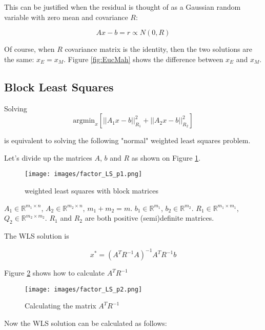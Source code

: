 \documentclass{article}
\begin{document}
This can be justified when the residual is thought of as a Gaussian random variable with zero mean and covariance $R$:

\begin{equation}
    Ax - b = r \propto N(0, R)
\end{equation}

Of course, when $R$ covariance matrix is the identity, then the two solutions are the same: $x_E = x_M$. Figure \ref{fig:EucMah} shows the difference between $x_E$ and $x_M$.

\subsection{Block Least Squares}

Solving
\begin{equation}
    \text{argmin}_x \left[||A_1 x - b||^2_{R_1} + ||A_2 x - b||^2_{R_2}\right]
\end{equation}

is equivalent to solving the following "normal" weighted least squares problem.

Let's divide up the matrices $A$, $b$ and $R$ as shown on Figure \ref{fig:BlockLS}.

\begin{figure}[ht]
 \centering
  \texttt{[image: images/factor\_LS\_p1.png]}
  \caption{weighted least squares with block matrices}
  \label{fig:BlockLS}
\end{figure}


$A_1 \in \mathbb{R}^{m_1 \times n}$, $A_2 \in \mathbb{R}^{m_2 \times n}$, $m_1 + m_2 = m$. $b_1 \in \mathbb{R}^{m_1}$, $b_2 \in \mathbb{R}^{m_2}$. $R_1 \in \mathbb{R}^{m_1 \times m_1}$, $Q_2 \in \mathbb{R}^{m_2 \times m_2}$. $R_1$ and $R_2$ are both positive (semi)definite matrices.

The WLS solution is

\begin{equation}
    x^* = (A^T R^{-1} A)^{-1} A^T R^{-1} b
\end{equation}

Figure \ref{fig:BlockLS2} shows how to calculate $A^T R^{-1}$

\begin{figure}[ht]
 \centering
  \texttt{[image: images/factor\_LS\_p2.png]}
  \caption{Calculating the matrix $A^T R^{-1}$}
  \label{fig:BlockLS2}
\end{figure}

Now the WLS solution can be calculated as follows:
\end{document}
